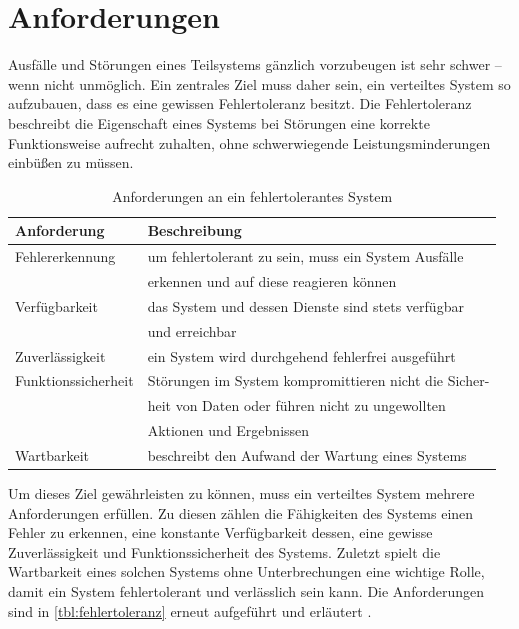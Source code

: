 \documentclass[12pt,a4paper,parskip=half]{scrreprt}
\begin{document}
		\section{Anforderungen}
			
			Ausfälle und Störungen eines Teilsystems gänzlich vorzubeugen ist sehr schwer -- wenn nicht unmöglich. Ein zentrales Ziel muss daher sein, ein verteiltes System so aufzubauen, dass es eine gewissen Fehlertoleranz besitzt. Die Fehlertoleranz beschreibt die Eigenschaft eines Systems bei Störungen eine korrekte Funktionsweise aufrecht zuhalten, ohne schwerwiegende Leistungsminderungen einbüßen zu müssen.
			
			\begin{table}[h]
				\centering
				\begin{tabular}[h]{ll}
					\toprule
					Anforderung 		& Beschreibung \\
					\midrule
					Fehlererkennung		& um fehlertolerant zu sein, muss ein System Ausfälle \\
					& erkennen und auf diese reagieren können \vspace{4pt} \\
					Verfügbarkeit 		& das System und dessen Dienste sind stets verfügbar \\
					& und erreichbar \vspace{4pt} \\
					Zuverlässigkeit		& ein System wird durchgehend fehlerfrei ausgeführt  \vspace{4pt} \\
					Funktionssicherheit	& Störungen im System kompromittieren nicht die Sicher- \\
					& heit von Daten oder führen nicht zu ungewollten \\
					& Aktionen und Ergebnissen \vspace{4pt} \\
					Wartbarkeit 		& beschreibt den Aufwand der Wartung eines Systems \\		
					\bottomrule
				\end{tabular}
				\captionsetup{font = small}
				\caption{Anforderungen an ein fehlertolerantes System}
				\label{tbl:fehlertoleranz}
			\end{table}
			
			Um dieses Ziel gewährleisten zu können, muss ein verteiltes System mehrere Anforderungen erfüllen. Zu diesen zählen die Fähigkeiten des Systems einen Fehler zu erkennen, eine konstante Verfügbarkeit dessen, eine gewisse Zuverlässigkeit und Funktionssicherheit des Systems. Zuletzt spielt die Wartbarkeit eines solchen Systems ohne Unterbrechungen eine wichtige Rolle, damit ein System fehlertolerant und verlässlich sein kann. Die Anforderungen sind in \autoref{tbl:fehlertoleranz} erneut aufgeführt und erläutert \cite{vS-TU-Braunschweig}.
			
\end{document}
